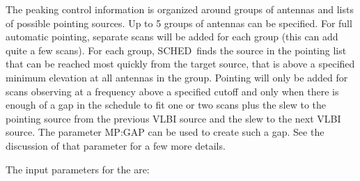 \documentclass{report}
\newcommand{\schedb}{{\sc SCHED~}}
\begin{document}
The peaking control information is organized around groups of antennas
and lists of possible pointing sources.  Up to 5 groups of antennas
can be specified.  For full automatic pointing, separate scans will be
added for each group (this can add quite a few scans).  For each
group, \schedb finds the source in the pointing list that can be
reached most quickly from the target source, that is above a specified
minimum elevation at all antennas in the group.  Pointing will only be
added for scans observing at a frequency above a specified cutoff and
only when there is enough of a gap in the schedule to fit one or two
scans plus the slew to the pointing source from the previous VLBI source
and the slew to the next VLBI source.  The parameter 
{MP:GAP} can be used to create such a gap.  See the discussion of
that parameter for a few more details.

The input parameters for the  are:
\end{document}
